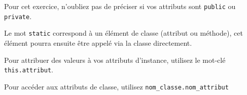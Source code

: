 \begin{Exercice}[10 minutes]
\begin{conseil}
   Pour cet exercice, n'oubliez pas de préciser si vos attributs sont \lstinline{public} ou \lstinline{private}.
   
   Le mot \lstinline{static} correspond à un élément de classe (attribut ou méthode), cet élément pourra ensuite être appelé via la classe directement.
   
   Pour attribuer des valeurs à vos attributs d'instance, utilisez le mot-clé \lstinline{this.attribut}.
   
   Pour accéder aux attributs de classe, utilisez \lstinline{nom_classe.nom_attribut}
\end{conseil}
    
\begin{solution}
	
\end{solution}
\end{Exercice}

